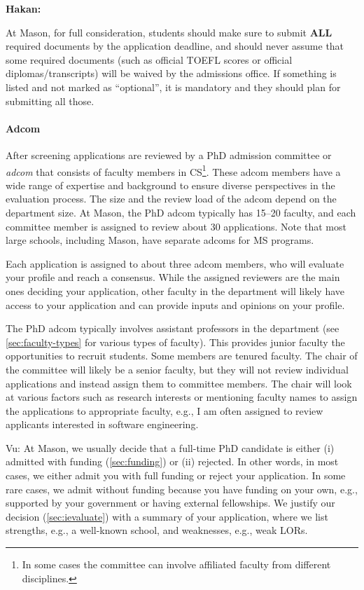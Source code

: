 \documentclass[oneside,11pt,dvipsnames]{book}
\newenvironment{commentbox}[1][]{
  \small
  \begin{mybox}
    {\small \textbf{#1}}
  }{
  \end{mybox}
}
\begin{document}
\begin{commentbox}[Hakan:]
  At Mason, for full consideration, students should make sure to submit \textbf{ALL} required documents by the application deadline, and should never assume that some required documents (such as official TOEFL scores or official diplomas/transcripts) will be waived by the admissions office. If something is listed and not marked as ``optional'', it is mandatory and they should plan for submitting all those.
\end{commentbox}

\paragraph{Adcom} After screening applications are reviewed by a PhD admission committee or \emph{adcom} that consists of faculty members in CS\footnote{In some cases the committee can involve affiliated faculty from different disciplines.}. These adcom members have a wide range of expertise and background to ensure diverse perspectives in the evaluation process. The size and the review load of the adcom depend on the department size. At Mason, the PhD adcom typically has 15--20 faculty, and each committee member is assigned to review about 30 applications. Note that most large schools, including Mason, have separate adcoms for MS programs.

Each application is assigned to about three adcom members, who will evaluate your profile and reach a consensus.  While the assigned reviewers are the main ones deciding your application, other faculty in the department will likely have access to your application and can provide inputs and opinions on your profile.

The PhD adcom typically involves assistant professors in the department (see \autoref{sec:faculty-types} for various types of faculty). This provides junior faculty the opportunities to recruit students. Some members are tenured faculty. The chair of the committee will likely be a senior faculty, but they will not review individual applications and instead assign them to committee members. The chair will look at various factors such as research interests or mentioning faculty names to assign the applications to appropriate faculty, e.g., I am often assigned to review applicants interested in software engineering.

\begin{commentbox}{Vu:}
At Mason, we usually decide that a full-time PhD candidate is either (i) admitted with funding (\autoref{sec:funding}) or (ii) rejected. In other words, in most cases, we either
admit you with full funding or reject your application. In some rare cases, we admit
without funding because you have funding on your own, e.g.,
supported by your government or having external fellowships. We justify
our decision (\autoref{sec:ievaluate}) with a summary of your application, where we list
strengths, e.g., a well-known school, and weaknesses, e.g., weak
LORs.
\end{commentbox}
\end{document}
